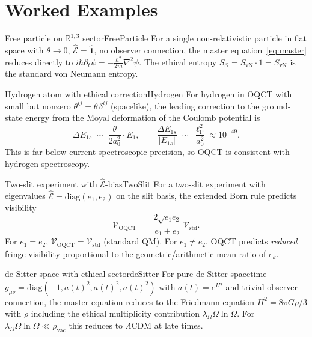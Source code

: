 \documentclass[11pt,a4paper]{article}
\theoremstyle{myrmk}
\newcommand{\lP}{\ell_{\mathrm{P}}}
\newcommand{\Ehat}{\hat{\mathcal{E}}}
\newcommand{\Identity}{\hat{\mathbf{1}}}
\begin{document}
\section{Worked Examples}
\label{sec:examples}

\begin{example}{Free particle on $\mathbb{R}^{1,3}$ sector}{FreeParticle}
For a single non-relativistic particle in flat space with $\theta\to 0$,
$\Ehat=\Identity$, no observer connection, the master equation~\eqref{eq:master}
reduces directly to $i\hbar\partial_t\psi=-\tfrac{\hbar^2}{2m}\nabla^2\psi$. The
ethical entropy $S_{\mathcal{O}}=S_{\mathrm{vN}}\cdot 1=S_{\mathrm{vN}}$ is the
standard von Neumann entropy.
\end{example}

\begin{example}{Hydrogen atom with ethical correction}{Hydrogen}
For hydrogen in OQCT with small but nonzero $\theta^{ij}=\theta\,\delta^{ij}$
(spacelike), the leading correction to the ground-state energy from the Moyal
deformation of the Coulomb potential is
\begin{equation}
  \Delta E_{1s} \;\sim\; \frac{\theta}{2 a_0^{2}} \cdot E_1,
  \qquad
  \frac{\Delta E_{1s}}{|E_{1s}|} \;\sim\; \frac{\lP^{2}}{a_0^{2}} \approx 10^{-49}.
\end{equation}
This is far below current spectroscopic precision, so OQCT is consistent with hydrogen
spectroscopy.
\end{example}

\begin{example}{Two-slit experiment with $\Ehat$-bias}{TwoSlit}
For a two-slit experiment with eigenvalues $\Ehat=\mathrm{diag}(e_1,e_2)$ on the slit
basis, the extended Born rule predicts visibility
\begin{equation}
  \mathcal{V}_{\mathrm{OQCT}} \;=\; \frac{2\sqrt{e_1 e_2}}{e_1+e_2}\,\mathcal{V}_{\mathrm{std}}.
\end{equation}
For $e_1=e_2$, $\mathcal{V}_{\mathrm{OQCT}}=\mathcal{V}_{\mathrm{std}}$ (standard QM).
For $e_1\neq e_2$, OQCT predicts \emph{reduced} fringe visibility proportional to the
geometric/arithmetic mean ratio of $e_k$.
\end{example}

\begin{example}{de Sitter space with ethical sector}{deSitter}
For pure de Sitter spacetime $g_{\mu\nu}=\mathrm{diag}(-1,a(t)^2,a(t)^2,a(t)^2)$ with
$a(t)=e^{Ht}$ and trivial observer connection, the master equation reduces to the
Friedmann equation $H^2=8\pi G\rho/3$ with $\rho$ including the ethical multiplicity
contribution $\lambda_\Omega\Omega\ln\Omega$. For
$\lambda_\Omega\Omega\ln\Omega\ll\rho_{\mathrm{vac}}$ this reduces to $\Lambda$CDM at
late times.
\end{example}
\end{document}
